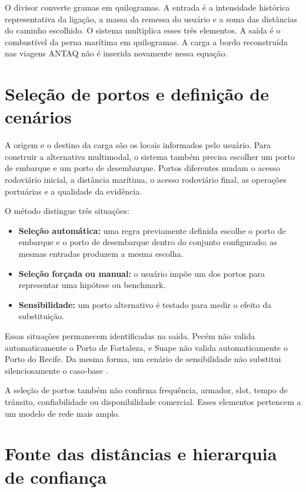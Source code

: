 O divisor converte gramas em quilogramas. A entrada é a intensidade histórica representativa da ligação, a massa da remessa do usuário e a soma das distâncias do caminho escolhido. O sistema multiplica esses três elementos. A saída é o combustível da perna marítima em quilogramas. A carga a bordo reconstruída nas viagens ANTAQ não é inserida novamente nessa equação.

\section{Seleção de portos e definição de cenários}
\label{sec:selecao-portos}

A origem e o destino da carga são os locais informados pelo usuário. Para construir a alternativa multimodal, o sistema também precisa escolher um porto de embarque e um porto de desembarque. Portos diferentes mudam o acesso rodoviário inicial, a distância marítima, o acesso rodoviário final, as operações portuárias e a qualidade da evidência.

O método distingue três situações:

\begin{itemize}
  \item \textbf{Seleção automática:} uma regra previamente definida escolhe o porto de embarque e o porto de desembarque dentro do conjunto configurado; as mesmas entradas produzem a mesma escolha.
  \item \textbf{Seleção forçada ou manual:} o usuário impõe um dos portos para representar uma hipótese ou benchmark.
  \item \textbf{Sensibilidade:} um porto alternativo é testado para medir o efeito da substituição.
\end{itemize}

Essas situações permanecem identificadas na saída. Pecém não valida automaticamente o Porto de Fortaleza, e Suape não valida automaticamente o Porto do Recife. Da mesma forma, um cenário de sensibilidade não substitui silenciosamente o caso-base \cite{competitiveness2024,modalshiftreview2020}.

A seleção de portos também não confirma frequência, armador, slot, tempo de trânsito, confiabilidade ou disponibilidade comercial. Esses elementos pertencem a um modelo de rede mais amplo.

\section{Fonte das distâncias e hierarquia de confiança}
\label{sec:proveniencia-distancias}

